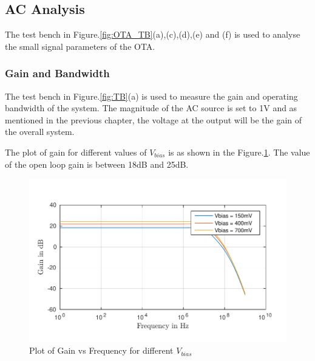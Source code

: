 \subsection{AC Analysis}
The test bench in Figure.\ref{fig:OTA_TB}(a),(c),(d),(e) and (f) is used to analyse the small signal parameters of the OTA.
\subsubsection{Gain and Bandwidth}
The test bench in Figure.\ref{fig:TB}(a) is used to measure the gain and operating bandwidth of the system. The magnitude of the AC source is set to 1V and as mentioned in the previous chapter, the voltage at the output will be the gain of the overall system.

The plot of gain for different values of $V_{bias}$ is as shown in the Figure.\ref{fig:Gain}. The value of the open loop gain is between 18dB and 25dB.
\begin{figure} [H]
\centering
\includegraphics[scale=1]{Figures/Plots/Ov_Gain.pdf}
\caption{Plot of Gain vs Frequency for different $V_{bias}$}
\label{fig:Gain}
\end{figure}


